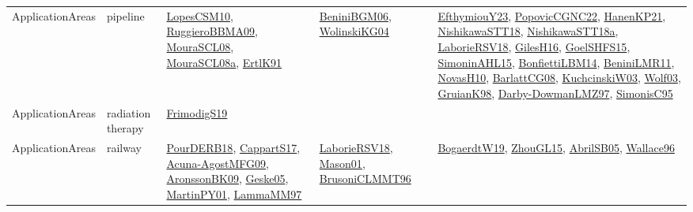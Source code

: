 {\begin{longtable}{lp{3cm}>{\raggedright}p{6cm}>{\raggedright}p{6cm}p{8cm}}
ApplicationAreas & pipeline & \href{articles/LopesCSM10.pdf}{LopesCSM10}\cite{LopesCSM10}, \href{articles/RuggieroBBMA09.pdf}{RuggieroBBMA09}\cite{RuggieroBBMA09}, \href{papers/MouraSCL08.pdf}{MouraSCL08}\cite{MouraSCL08}, \href{papers/MouraSCL08a.pdf}{MouraSCL08a}\cite{MouraSCL08a}, \href{papers/ErtlK91.pdf}{ErtlK91}\cite{ErtlK91} & \href{papers/BeniniBGM06.pdf}{BeniniBGM06}\cite{BeniniBGM06}, \href{papers/WolinskiKG04.pdf}{WolinskiKG04}\cite{WolinskiKG04} & \href{papers/EfthymiouY23.pdf}{EfthymiouY23}\cite{EfthymiouY23}, \href{papers/PopovicCGNC22.pdf}{PopovicCGNC22}\cite{PopovicCGNC22}, \href{papers/HanenKP21.pdf}{HanenKP21}\cite{HanenKP21}, \href{papers/NishikawaSTT18.pdf}{NishikawaSTT18}\cite{NishikawaSTT18}, \href{papers/NishikawaSTT18a.pdf}{NishikawaSTT18a}\cite{NishikawaSTT18a}, \href{articles/LaborieRSV18.pdf}{LaborieRSV18}\cite{LaborieRSV18}, \href{papers/GilesH16.pdf}{GilesH16}\cite{GilesH16}, \href{articles/GoelSHFS15.pdf}{GoelSHFS15}\cite{GoelSHFS15}, \href{articles/SimoninAHL15.pdf}{SimoninAHL15}\cite{SimoninAHL15}, \href{articles/BonfiettiLBM14.pdf}{BonfiettiLBM14}\cite{BonfiettiLBM14}, \href{articles/BeniniLMR11.pdf}{BeniniLMR11}\cite{BeniniLMR11}, \href{articles/NovasH10.pdf}{NovasH10}\cite{NovasH10}, \href{papers/BarlattCG08.pdf}{BarlattCG08}\cite{BarlattCG08}, \href{articles/KuchcinskiW03.pdf}{KuchcinskiW03}\cite{KuchcinskiW03}, \href{papers/Wolf03.pdf}{Wolf03}\cite{Wolf03}, \href{papers/GruianK98.pdf}{GruianK98}\cite{GruianK98}, \href{articles/Darby-DowmanLMZ97.pdf}{Darby-DowmanLMZ97}\cite{Darby-DowmanLMZ97}, \href{papers/SimonisC95.pdf}{SimonisC95}\cite{SimonisC95}\\
ApplicationAreas & radiation therapy & \href{papers/FrimodigS19.pdf}{FrimodigS19}\cite{FrimodigS19} &  & \\
ApplicationAreas & railway & \href{articles/PourDERB18.pdf}{PourDERB18}\cite{PourDERB18}, \href{papers/CappartS17.pdf}{CappartS17}\cite{CappartS17}, \href{papers/Acuna-AgostMFG09.pdf}{Acuna-AgostMFG09}\cite{Acuna-AgostMFG09}, \href{papers/AronssonBK09.pdf}{AronssonBK09}\cite{AronssonBK09}, \href{papers/Geske05.pdf}{Geske05}\cite{Geske05}, \href{articles/MartinPY01.pdf}{MartinPY01}\cite{MartinPY01}, \href{articles/LammaMM97.pdf}{LammaMM97}\cite{LammaMM97} & \href{articles/LaborieRSV18.pdf}{LaborieRSV18}\cite{LaborieRSV18}, \href{articles/Mason01.pdf}{Mason01}\cite{Mason01}, \href{papers/BrusoniCLMMT96.pdf}{BrusoniCLMMT96}\cite{BrusoniCLMMT96} & \href{papers/BogaerdtW19.pdf}{BogaerdtW19}\cite{BogaerdtW19}, \href{papers/ZhouGL15.pdf}{ZhouGL15}\cite{ZhouGL15}, \href{papers/AbrilSB05.pdf}{AbrilSB05}\cite{AbrilSB05}, \href{articles/Wallace96.pdf}{Wallace96}\cite{Wallace96}\\

\end{longtable}}
